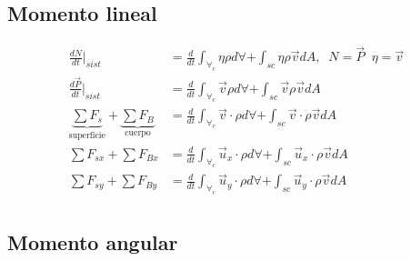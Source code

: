 \subsection{Momento lineal}
\[
    \begin{split}
        \frac{ dN }{ dt }\Big|_{sist} & = \frac{ d }{ dt } \int_{ \forall_{c} } \eta \rho d\forall + \int_{sc} \eta \rho \Vec{v} dA, \;\; N = \Vec{P} \;\; \eta = \Vec{v} \\
        \frac{ d\Vec{P} }{ dt }\Big|_{sist} & = \frac{ d }{ dt } \int_{ \forall_{c} } \Vec{v} \rho d\forall + \int_{sc} \Vec{v} \rho \Vec{v} dA \\
        \underbrace{ \sum F_{s} }_{ \text{superficie} } + \underbrace{ \sum F_{B} }_{ \text{cuerpo} } & = \frac{ d }{ dt } \int_{ \forall_{c} } \Vec{v} \cdot \rho d\forall + \int_{sc} \Vec{v} \cdot \rho \Vec{v} dA \\
        \sum F_{sx} + \sum F_{Bx} & = \frac{ d }{ dt } \int_{\forall_{c}} \Vec{u}_{x} \cdot \rho d\forall + \int_{sc} \Vec{u}_{x} \cdot \rho \Vec{v} dA \\
        \sum F_{sy} + \sum F_{By} & = \frac{ d }{ dt } \int_{\forall_{c}} \Vec{u}_{y} \cdot \rho d\forall + \int_{sc} \Vec{u}_{y} \cdot \rho \Vec{v} dA \\
    \end{split}
\]

\subsection{Momento angular}